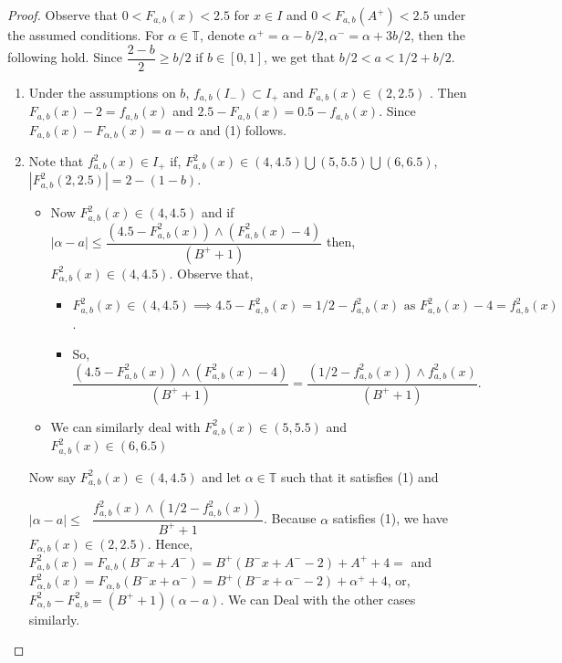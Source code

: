 \documentclass[10pt,a4paper]{amsart}
\begin{document}
\begin{proof}
Observe that $0<F_{a,b}(x)<2.5$ for $x\in I$ and $0<F_{a,b}(A^+)< 2.5$ under the assumed conditions. For $\alpha \in \mathbb{T}$, denote $\alpha^+=\alpha-b/2, \alpha^-=\alpha+3b/2$, then the following hold. Since $\dfrac{2-b}{2}\geq b/2$ if $b \in [0,1] $, we get that $b/2<a<1/2+b/2$. 
 
 \vspace{.3cm}
 
\begin{enumerate}
    \item Under the assumptions on $b$, $f_{a,b}(I_-) \subset I_+$ and  $F_{a,b}(x) \in (2,2.5)$ . Then  $F_{a,b}(x)-2=f_{a,b}(x)$ and $2.5-F_{a,b}(x)=0.5-f_{a,b}(x)$.
    Since $F_{a,b}(x)-F_{\alpha,b}(x)=a-\alpha$ and (1) follows.
    
    \vspace{.3cm}
    \item Note that $f^2_{a,b}(x) \in I_+$ if,  $F^2_{a,b}(x)  \in (4,4.5 ) \bigcup (5,5.5)\bigcup (6,6.5)$, $|F_{a,b}^2(2,2.5)|= 2-(1-b)$.
    \vspace{.1cm}
\begin{itemize}
    \item Now $F^2_{a,b}(x)  \in (4,4.5 )$ and if  $|\alpha-a|\leq \dfrac{(4.5 -F^2_{a,b}(x) ) \wedge (F^2_{a,b}(x)-4)  }{(B^++1)}$ then,\\ $F^2_{\alpha,b}(x) \in (4,4.5) $. Observe that,
    \vspace{.3cm}
    \begin{itemize}
        \item[]  $F^2_{a,b}(x)  \in (4,4.5 ) \implies 4.5 -F^2_{a,b}(x) = 1/2-f_{a,b}^2(x) \text{ as } F^2_{a,b}(x)-4 = f^2_{a,b}(x) $.
        \vspace{.3cm}
        \item[] So, $\dfrac{(4.5 -F^2_{a,b}(x))  \wedge( F^2_{a,b}(x)-4)  }{(B^++1)}=\dfrac{(1/2 -f^2_{a,b}(x))  \wedge f^2_{a,b}(x) }{(B^++1)}.$ 
    \end{itemize}
   \vspace{.3cm}
    \item  We can similarly deal with $F^2_{a,b}(x)  \in (5,5.5 ) $ and $F^2_{a,b}(x)  \in (6,6.5 ) $
    
\end{itemize}
    Now say $F_{a,b}^2(x) \in (4,4.5)$ and let $\alpha \in \mathbb{T} $ such that it satisfies (1) and
    \vspace{.3cm}
    
    $|\alpha-a| \leq \text{ } \dfrac{f^2_{a,b}(x) \wedge (1/2-f^2_{a,b}(x))}{B^++1}$. Because $\alpha$ satisfies (1), we have $F_{\alpha,b}(x) \in (2,2.5)$. Hence, 
    $F^2_{a,b}(x)=F_{a,b}(B^-x+A^-)=B^+(B^-x+A^--2) +A^++4=$ and $F^2_{\alpha,b}(x)=F_{\alpha,b}(B^-x+\alpha^-)=B^+(B^-x+\alpha^--2) +\alpha^++4$, or, $F^2_{\alpha,b}-F^2_{a,b}= (B^++1)(\alpha-a)$. We can Deal with the other cases similarly.
    

\end{enumerate}
\end{proof}
\end{document}
